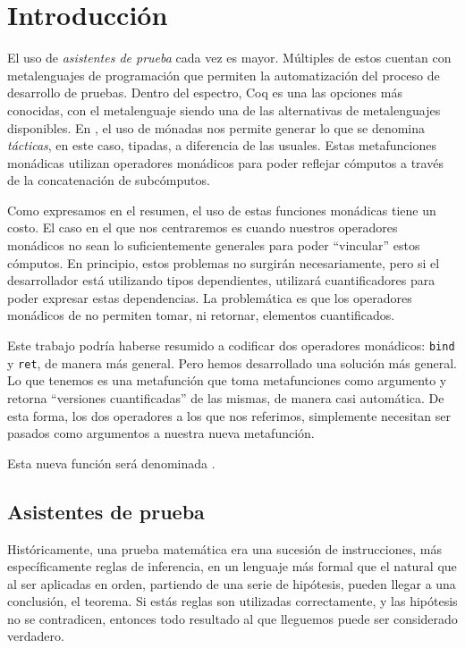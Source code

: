 \chapter{Introducción}\label{ch:intro}

El uso de \emph{asistentes de prueba} cada vez es mayor.
Múltiples de estos cuentan con metalenguajes de programación que permiten la automatización del proceso de desarrollo de pruebas.
Dentro del espectro, Coq \cite{CIC} es una las opciones más conocidas, con el metalenguaje \mtac \cite{DBLP:journals/pacmpl/KaiserZKRD18} siendo una de las alternativas de metalenguajes disponibles.
En \Mtac, el uso de mónadas nos permite generar lo que se denomina \emph{tácticas}, en este caso, tipadas, a diferencia de las usuales.
Estas metafunciones monádicas utilizan operadores monádicos para poder reflejar cómputos a través de la concatenación de subcómputos.

Como expresamos en el resumen, el uso de estas funciones monádicas tiene un costo.
El caso en el que nos centraremos es cuando nuestros operadores monádicos no sean lo suficientemente generales para poder ``vincular'' estos cómputos.
En principio, estos problemas no surgirán necesariamente, pero si el desarrollador está utilizando tipos dependientes, utilizará cuantificadores para poder expresar estas dependencias. La problemática es que los operadores monádicos de \mtac no permiten tomar, ni retornar, elementos cuantificados.

Este trabajo podría haberse resumido a codificar dos operadores monádicos: \lstinline{bind} y \lstinline{ret}, de manera más general.
Pero hemos desarrollado una solución más general.
Lo que tenemos es una metafunción que toma metafunciones como argumento y retorna ``versiones cuantificadas'' de las mismas, de manera casi automática.
De esta forma, los dos operadores a los que nos referimos, simplemente necesitan ser pasados como argumentos a nuestra nueva metafunción.

Esta nueva función será denominada \lift.

\section{Asistentes de prueba}

Históricamente, una prueba matemática era una sucesión de instrucciones, más específicamente reglas de inferencia, en un lenguaje más formal que el natural que al ser aplicadas en orden, partiendo de una serie de hipótesis, pueden llegar a una conclusión, el teorema.
Si estás reglas son utilizadas correctamente, y las hipótesis no se contradicen, entonces todo resultado al que lleguemos puede ser considerado verdadero.

